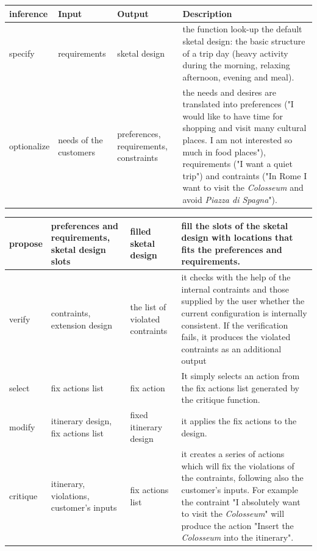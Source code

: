 \documentclass[11pt]{article} %
\begin{document}
\noindent
\begin{tabularx}{\textwidth}{| X | X | X | X |}
  \hline
inference		& Input	& Output 	& Description \\ \hline \hline
specify		& requirements	& sketal design		& the function look-up the default sketal design: the basic structure of a trip day (heavy activity during the morning, relaxing afternoon, evening and meal).
\\ \hline 
   optionalize	& needs of the customers		& preferences, requirements, constraints	& the needs and desires are translated into preferences ("I would like to have time for shopping and visit many cultural places. I am not interested so much in food places"), requirements ("I want a quiet trip") and contraints ("In Rome I want to visit the \emph{Colosseum} and avoid \emph{Piazza di Spagna}"). 
\\ \hline
\end{tabularx}
\noindent
\begin{tabularx}{\textwidth}{| X | X | X | X |}
\hline
propose	& preferences and requirements, sketal design slots		& filled sketal design	& fill the slots of the sketal design with locations that fits the preferences and requirements.
\\ \hline
verify		& contraints, extension design	& the list of violated contraints	& it checks with the help of the internal contraints and those supplied by the user whether the current configuration is internally consistent. If the verification fails, it produces the violated contraints as an additional output
\\ \hline
select 	& fix actions list		& fix action		& It simply selects an action from the fix actions list generated by the critique function.
\\ \hline
modify	& itinerary design, fix actions list		& fixed itinerary design		& it applies the fix actions to the design.
\\ \hline
critique	& itinerary, violations, customer's inputs	& fix actions list		& it creates a series of actions which will fix the violations of the contraints, following also the customer's inputs. For example the contraint "I absolutely want to visit the \emph{Colosseum}" will produce the action "Insert the \emph{Colosseum} into the itinerary".
\\ \hline
\end{tabularx}

\end{document}

